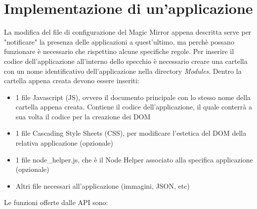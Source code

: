 \section{Implementazione di un'applicazione}\label{cap:app}
La modifica del file di configurazione del Magic Mirror appena descritta serve per "notificare" la presenza delle applicazioni a quest'ultimo,
ma perch\`e possano funzionare \`e necessario che rispettino alcune specifiche regole.
Per inserire il codice dell'applicazione all'interno dello specchio \`e necessario creare una cartella con un nome identificativo dell'applicazione
nella directory \textit{Modules}.
Dentro la cartella appena creata devono essere inseriti:
\begin{itemize}
\item 1 file Javascript (JS), ovvero il documento principale con lo stesso nome della cartella appena creata. Contiene il codice dell'applicazione, il quale
conterr\`a a sua volta il codice per la creazione dei DOM
\item 1 file Cascading Style Sheets (CSS), per modificare l'estetica del DOM della relativa applicazione (opzionale)
\item 1 file node\_helper.js, che \`e il Node Helper associato alla specifica applicazione (opzionale)
\item Altri file necessari all'applicazione (immagini, JSON, etc)\\[1\baselineskip]
\end{itemize}
\iffalse
Le funzioni offerte dalle API sono:

